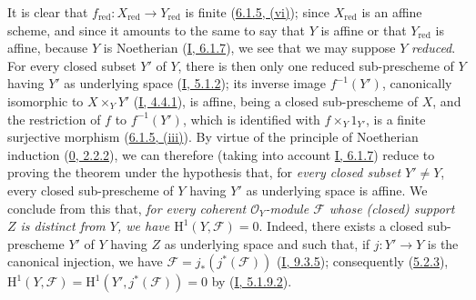 It is clear that
$f_{\mathrm{red}}:X_{\mathrm{red}}\to Y_{\mathrm{red}}$ is finite
(\hyperref[II.6.1.5]{6.1.5, (vi)}); since $X_{\mathrm{red}}$ is an
affine scheme, and since it amounts to the same to say that $Y$ is affine or
that $Y_{\mathrm{red}}$ is affine, because $Y$ is Noetherian
(\hyperref[I.6.1.7]{I, 6.1.7}), we see that we may suppose $Y$
\emph{reduced}. For every closed subset $Y'$ of $Y$, there is then only one
reduced sub-prescheme of $Y$ having $Y'$ as underlying space
(\hyperref[I.5.1.2]{I, 5.1.2}); its inverse image $f^{-1}(Y')$,
canonically isomorphic to $X\times_Y Y'$
(\hyperref[I.4.4.1]{I, 4.4.1}), is affine, being a closed sub-prescheme of
$X$, and the restriction of $f$ to $f^{-1}(Y')$, which is identified with
$f\times_Y 1_{Y'}$, is a finite surjective morphism
(\hyperref[II.6.1.5]{6.1.5, (iii)}). By virtue of the principle of
Noetherian induction (\hyperref[0.2.2.2]{0, 2.2.2}), we can therefore
(taking into account
\hyperref[I.6.1.7]{I, 6.1.7}) reduce to proving the theorem under
the hypothesis that, for \emph{every closed subset $Y'\neq Y$}, every
closed sub-prescheme of $Y$ having $Y'$ as underlying space is affine.
We conclude from this that, \emph{for every coherent $\mathcal{O}_Y$-module
$\mathcal{F}$ whose (closed) support $Z$ is distinct from $Y$, we have
$\mathrm{H}^1(Y,\mathcal{F})=0$}. Indeed, there exists a closed sub-prescheme
$Y'$ of $Y$ having $Z$ as underlying space and such that, if $j:Y'\to Y$ is
the canonical injection, we have
$\mathcal{F}=j_*(j^*(\mathcal{F}))$
(\hyperref[I.9.3.5]{I, 9.3.5}); consequently
(\hyperref[II.5.2.3]{5.2.3}),
$\mathrm{H}^1(Y,\mathcal{F})
=\mathrm{H}^1(Y',j^*(\mathcal{F}))=0$ by
(\hyperref[I.5.1.9.2]{I, 5.1.9.2}).

